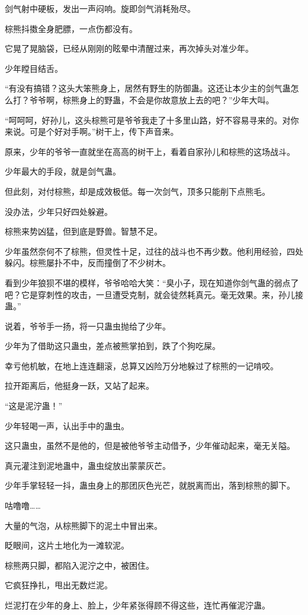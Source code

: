 \begin{this_body}
剑气射中硬板，发出一声闷响。旋即剑气消耗殆尽。

棕熊抖擞全身肥膘，一点伤都没有。

它晃了晃脑袋，已经从刚刚的眩晕中清醒过来，再次掉头对准少年。

少年瞠目结舌。

“有没有搞错？这头大笨熊身上，居然有野生的防御蛊。这还让本少主的剑气蛊怎么打？爷爷啊，棕熊身上的野蛊，不会是你故意放上去的吧？”少年大叫。

“呵呵呵，好孙儿，这头棕熊可是爷爷我走了十多里山路，好不容易寻来的。对你来说。可是个好对手啊。”树干上，传下声音来。

原来，少年的爷爷一直就坐在高高的树干上，看着自家孙儿和棕熊的这场战斗。

少年最大的手段，就是剑气蛊。

但此刻，对付棕熊，却是成效极低。每一次剑气，顶多只能削下点熊毛。

没办法，少年只好四处躲避。

棕熊来势凶猛，但到底是野兽。智慧不足。

少年虽然奈何不了棕熊，但灵性十足，过往的战斗也不再少数。他利用经验，四处躲闪。棕熊屡扑不中，反而撞倒了不少树木。

看到少年狼狈不堪的模样，爷爷哈哈大笑：“臭小子，现在知道你剑气蛊的弱点了吧？它是穿刺性的攻击，一旦遭受克制，就会徒然耗真元。毫无效果。来，孙儿接蛊。”

说着，爷爷手一扬，将一只蛊虫抛给了少年。

少年为了借助这只蛊虫，差点被熊掌拍到，跌了个狗吃屎。

幸亏他机敏，在地上连连翻滚，总算又凶险万分地躲过了棕熊的一记啃咬。

拉开距离后，他挺身一跃，又站了起来。

“这是泥泞蛊！”

少年轻喝一声，认出手中的蛊虫。

这只蛊虫，虽然不是他的，但是被他爷爷主动借予，少年催动起来，毫无关隘。

真元灌注到泥地蛊中，蛊虫绽放出蒙蒙灰芒。

少年手掌轻轻一抖，蛊虫身上的那团灰色光芒，就脱离而出，落到棕熊的脚下。

咕噜噜……

大量的气泡，从棕熊脚下的泥土中冒出来。

眨眼间，这片土地化为一滩软泥。

棕熊两只脚，都陷入泥泞之中，被困住。

它疯狂挣扎，甩出无数烂泥。

烂泥打在少年的身上、脸上，少年紧张得顾不得这些，连忙再催泥泞蛊。


\end{this_body}
